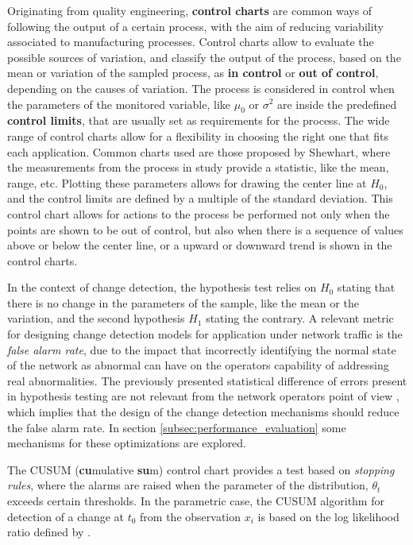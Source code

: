 \par Originating from quality engineering, \textbf{control charts} are common ways of following the output of a certain process, with the aim of reducing variability
associated to manufacturing processes. Control charts allow to evaluate the possible sources of variation, and classify the output of the process, based on the mean
or variation of the sampled process, as \textbf{in control} or \textbf{out of control}, depending on the causes of variation. The process is considered in control
when the parameters of the monitored variable, like $\mu_0$ or $\sigma^2$ are inside the predefined \textbf{control limits}, that are usually set as requirements for
the process. The wide range of control charts allow for a flexibility in choosing the right one that fits each application. Common charts used are those proposed by 
Shewhart, where the measurements from the process in study provide a statistic, like the mean, range, etc. Plotting these parameters allows for drawing the center
line at $H_0$, and the control limits are defined by a multiple of the standard deviation. This control chart allows for actions to the process be performed not only
when the points are shown to be out of control, but also when there is a sequence of values above or below the center line, or a upward or downward trend is shown in
the control charts.

\par In the context of change detection, the hypothesis test relies on $H_0$ stating that there is no change in the parameters of the sample, like the mean or the
variation, and the second hypothesis $H_1$ stating the contrary. A relevant metric for designing change detection models for application under network traffic is the
\textit{false alarm rate}, due to the impact that incorrectly identifying the normal state of the network as abnormal can have on the operators capability of 
addressing real abnormalities. The previously presented statistical difference of errors present in hypothesis testing are not relevant from the network operators
point of view \cite{munz_traffic_2010},
which implies that the design of the change detection mechanisms should reduce the false alarm rate. In section \ref{subsec:performance_evaluation} some mechanisms
for these optimizations are explored.

\par The CUSUM (\textbf{cu}mulative \textbf{su}m) control chart provides a test based on \textit{stopping rules}, where the alarms are raised when the parameter
of the distribution, $\theta_t$ exceeds certain thresholds. In the parametric case, the CUSUM algorithm for detection of a change at $t_0$ from the observation
$x_i$ is based on the log likelihood ratio defined by \cite{ahmed_novel_2008}.

